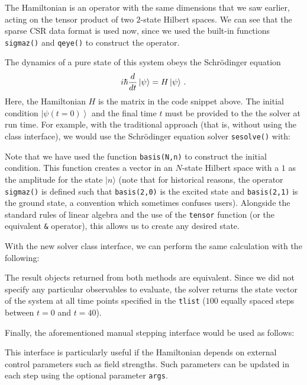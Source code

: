 \documentclass[preprint,3p,sort&compress]{elsarticle}
\def\code#1{\texttt{#1}}
\begin{document}
%
The Hamiltonian is an operator with the same dimensions that we saw earlier, acting on the tensor product of two $2$-state Hilbert spaces. We can see that the sparse CSR data format is used now, since we used the built-in functions \code{sigmaz()} and \code{qeye()} to construct the operator.

The dynamics of a pure state of this system obeys the Schr\"odinger equation
\begin{equation}
i\hbar\frac{d}{dt} \ket\psi = H \ket\psi \, .
\label{schrodinger}
\end{equation}
Here, the Hamiltonian $H$ is the matrix in the code snippet above. The initial condition $\left|\psi(t=0)\right>$ and the final time $t$ must be provided to the the solver at run time. For example, with the traditional approach (that is, without using the class interface), we would use the Schr\"odinger equation solver \code{sesolve()} with:

%
Note that we have used the function \code{basis(N,n)} to construct the initial condition. This function creates a vector in an $N$-state Hilbert space with a $1$ as the amplitude for the state $|n\rangle$ (note that for historical reasons, the operator \code{sigmaz()} is defined such that \code{basis(2,0)} is the excited state and \code{basis(2,1)} is the ground state, a convention which sometimes confuses users). Alongside the standard rules of linear algebra and the use of the \code{tensor} function (or the equivalent \code{\&} operator), this allows us to create any desired state.

With the new solver class interface, we can perform the same calculation with the following:

%
The result objects returned from both methods are equivalent.
Since we did not specify any particular observables to evaluate, the solver returns the state vector of the system at all time points specified in the \code{tlist} ($100$ equally spaced steps between $t=0$ and $t=40$).

Finally, the aforementioned manual stepping interface would be used as follows:

%
This interface is particularly useful if the Hamiltonian depends on external control parameters such as field strengths. Such parameters can be updated in each step using the optional parameter \code{args}.
\end{document}
